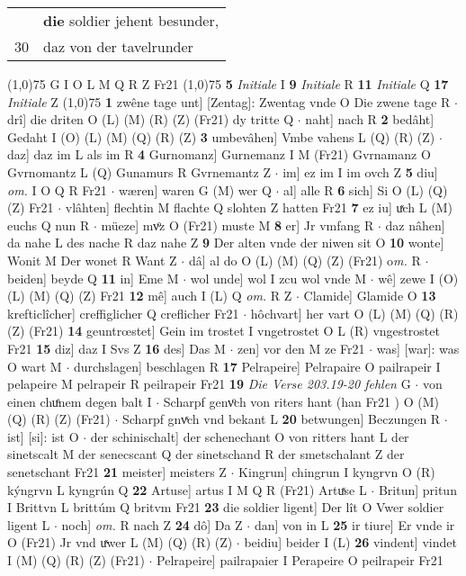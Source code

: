 \documentclass[8pt,a4paper,notitlepage]{article}
\begin{document}
\begin{table}[ht]
\begin{minipage}[t]{0.5\linewidth}
\begin{tabular}{rl}
 & \textbf{die} soldier jehent besunder,\\ 
30 & daz von der tavelrunder\\ 
\end{tabular}
\scriptsize
\line(1,0){75} \newline
G I O L M Q R Z Fr21 \newline
\line(1,0){75} \newline
\textbf{5} \textit{Initiale} I  \textbf{9} \textit{Initiale} R  \textbf{11} \textit{Initiale} Q  \textbf{17} \textit{Initiale} Z  \newline
\line(1,0){75} \newline
\textbf{1} zwêne tage unt] [Zentag]: Zwentag vnde O Die zwene tage R  $\cdot$ drî] die driten O (L) (M) (R) (Z) (Fr21) dy tritte Q  $\cdot$ naht] nach R \textbf{2} bedâht] Gedaht I (O) (L) (M) (Q) (R) (Z) \textbf{3} umbevâhen] Vmbe vahens L (Q) (R) (Z)  $\cdot$ daz] daz im L als im R \textbf{4} Gurnomanz] Gurnemanz I M (Fr21) Gvrnamanz O Gvrnomantz L (Q) Gunamurs R Gvrnemantz Z  $\cdot$ im] ez im I im ovch Z \textbf{5} diu] \textit{om.} I O Q R Fr21  $\cdot$ wæren] waren G (M) wer Q  $\cdot$ al] alle R \textbf{6} sich] Si O (L) (Q) (Z) Fr21  $\cdot$ vlâhten] flechtin M flachte Q slohten Z hatten Fr21 \textbf{7} ez iu] uͯch L (M) euchs Q nun R  $\cdot$ müeze] mvͦz O (Fr21) muste M \textbf{8} er] Jr vmfang R  $\cdot$ daz nâhen] da nahe L des nache R daz nahe Z \textbf{9} Der alten vnde der niwen sit O \textbf{10} wonte] Wonit M Der wonet R Want Z  $\cdot$ dâ] al do O (L) (M) (Q) (Z) (Fr21) o\textit{m. } R  $\cdot$ beiden] beyde Q \textbf{11} in] Eme M  $\cdot$ wol unde] wol I zcu wol vnde M  $\cdot$ wê] zewe I (O) (L) (M) (Q) (Z) Fr21 \textbf{12} mê] auch I (L) Q \textit{om.} R Z  $\cdot$ Clamide] Glamide O \textbf{13} krefticlîcher] creffiglicher Q creflicher Fr21  $\cdot$ hôchvart] her vart O (L) (M) (Q) (R) (Z) (Fr21) \textbf{14} geuntrœstet] Gein im trostet I vngetrostet O L (R) vngestrostet Fr21 \textbf{15} diz] daz I Svs Z \textbf{16} des] Das M  $\cdot$ zen] vor den M ze Fr21  $\cdot$ was] [war]: was O wart M  $\cdot$ durchslagen] beschlagen R \textbf{17} Pelrapeire] Pelrapaire O pailrapeir I pelapeire M pelrapeir R peilrapeir Fr21 \textbf{19} \textit{Die Verse 203.19-20 fehlen} G   $\cdot$ von einen chuͤnem degen balt I  $\cdot$ Scharpf genvͦch von riters hant (han Fr21 ) O (M) (Q) (R) (Z) (Fr21)  $\cdot$ Scharpf gnvͯch vnd bekant L \textbf{20} betwungen] Beczungen R  $\cdot$ ist] [si]: ist O  $\cdot$ der schinischalt] der schenechant O von ritters hant L der sinetscalt M der senecscant Q der sinetschand R der smetschalant Z der senetschant Fr21 \textbf{21} meister] meisters Z  $\cdot$ Kingrun] chingrun I kyngrvn O (R) kýngrvn L kyngrún Q \textbf{22} Artuse] artus I M Q R (Fr21) Artuͯse L  $\cdot$ Britun] pritun I Brittvn L brittúm Q britvm Fr21 \textbf{23} die soldier ligent] Der lît O Vwer soldier ligent L  $\cdot$ noch] \textit{om.} R nach Z \textbf{24} dô] Da Z  $\cdot$ dan] von in L \textbf{25} ir tiure] Er vnde ir O (Fr21) Jr vnd uͯwer L (M) (Q) (R) (Z)  $\cdot$ beidiu] beider I (L) \textbf{26} vindent] vindet I (M) (Q) (R) (Z) (Fr21)  $\cdot$ Pelrapeire] pailrapaier I Perapeire O peilrapeir Fr21  
\end{minipage}
\end{table}
\end{document}
